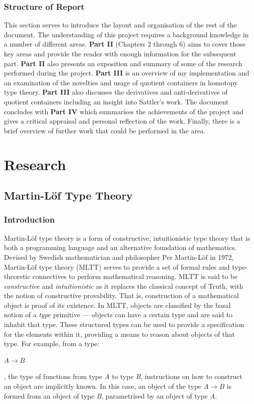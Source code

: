 \documentclass[12pt]{report}
\begin{document}
\section{Structure of Report}
This section serves to introduce the layout and organisation of the rest of the document. The understanding of this project requires a background knowledge in a number of different areas. \textbf{Part II} (Chapters 2 through 6) aims to cover those key areas and provide the reader with enough information for the subsequent part. \textbf{Part II} also presents an exposition and summary of some of the research performed during the project. \textbf{Part III} is an overview of my implementation and an examination of the novelties and usage of quotient containers in homotopy type theory. \textbf{Part III} also discusses the derivatives and anti-derivatives of quotient containers including an insight into Sattler's work. The document concludes with \textbf{Part IV} which summarises the achievements of the project and gives a critical appraisal and personal reflection of the work. Finally, there is a brief overview of further work that could be performed in the area. 



\part{Research}
\chapter{Martin-L\"of Type Theory}
\section{Introduction}
Martin-L\"of type theory is a form of constructive, intuitionistic type theory that is both a programming language and an alternative foundation of mathematics. Devised by Swedish mathematician and philosopher Per Martin-L\"of in 1972, Martin-L\"of type theory (MLTT) serves to provide a set of formal rules and type-theoretic connectives to perform mathematical reasoning.
MLTT is said to be \textit{constructive} and \textit{intuitionistic} as it replaces the classical concept of Truth, with the notion of constructive provability. That is, construction of a mathematical object is proof of its existence. In MLTT, objects are classified by the basal notion of a \textit{type} primitive --- objects can have a certain type and are said to inhabit that type. These structured types can be used to provide a specification for the elements within it, providing a means to reason about objects of that type. For example, from a type:
\begin{center}
$A \rightarrow B$
\end{center}
, the type of functions from type \textit{A} to type \textit{B}, instructions on how to construct an object are implicitly known. In this case, an object of the type $A \rightarrow B$ is formed from an object of type \textit{B}, parametrised by an object of type \textit{A}.
\end{document}
